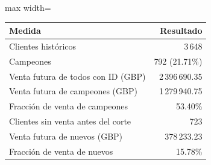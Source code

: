 \begin{center}\small\setlength{\tabcolsep}{4pt}
\begin{adjustbox}{max width=\textwidth}\begin{tabular}{lr}
\toprule
Medida & Resultado \\ \midrule
Clientes históricos & 3\,648 \\
Campeones & 792 (21.71\%) \\
Venta futura de todos con ID (GBP) & 2\,396\,690.35 \\
Venta futura de campeones (GBP) & 1\,279\,940.75 \\
Fracción de venta de campeones & 53.40\% \\
Clientes sin venta antes del corte & 723 \\
Venta futura de nuevos (GBP) & 378\,233.23 \\
Fracción de venta de nuevos & 15.78\% \\
\bottomrule\end{tabular}\end{adjustbox}\end{center}
